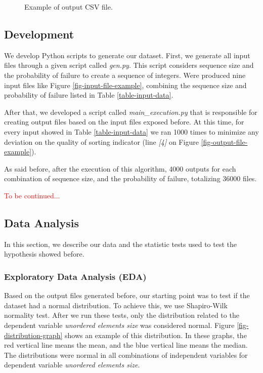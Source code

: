 \begin{figure}[H]
    \centering
    \fbox{
    \theverbbox
    }
    \caption{Example of output CSV file.}
    \label{fig-output-csv-file-example}
\end{figure}

\subsection{Development}

We develop Python scripts to generate our dataset. First, we generate all input files through a given script called \textit{gen.py}. This script considers sequence size and the probability of failure to create a sequence of integers. Were produced nine input files like Figure \ref{fig-input-file-example}, combining the sequence size and probability of failure listed in Table \ref{table-input-data}.

After that, we developed a script called \textit{main\_execution.py} that is responsible for creating output files based on the input files exposed before. At this time, for every input showed in Table \ref{table-input-data} we ran 1000 times to minimize any deviation on the quality of sorting indicator (line \textit{[4]} on Figure \ref{fig-output-file-example}).

As said before, after the execution of this algorithm, 4000 outputs for each combination of sequence size, and the probability of failure, totalizing 36000 files.

\textcolor{red}{To be continued...}

\subsection{Data Analysis}

In this section, we describe our data and the statistic tests used to test the hypothesis showed before.

\subsubsection{Exploratory Data Analysis (EDA)}

Based on the output files generated before, our starting point was to test if the dataset had a normal distribution. To achieve this, we use Shapiro-Wilk normality test. After we run these tests, only the distribution related to the dependent variable \textit{unordered elements size} was considered normal. Figure \ref{fig-distribution-graph} shows an example of this distribution. In these graphs, the red vertical line means the mean, and the blue vertical line means the median. The distributions were normal in all combinations of independent variables for dependent variable \textit{unordered elements size}.

